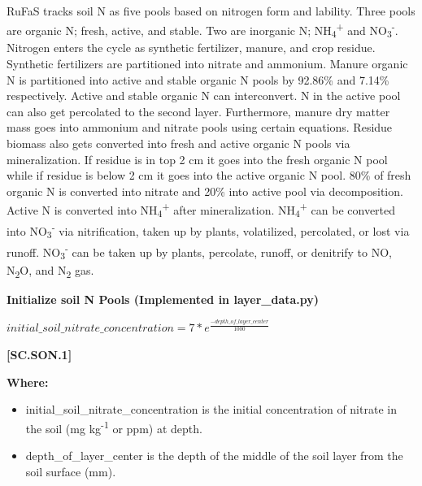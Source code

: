 RuFaS tracks soil N as five pools based on nitrogen form and lability. Three pools are organic N; fresh, active, and stable. Two are inorganic N; NH\textsubscript{4}\textsuperscript{+} and NO\textsubscript{3}\textsuperscript{-}. Nitrogen enters the cycle as synthetic fertilizer, manure, and crop residue. Synthetic fertilizers are partitioned into nitrate and ammonium. Manure organic N is partitioned into active and stable organic N pools by 92.86\% and 7.14\% respectively. Active and stable organic N can interconvert. N in the active pool can also get percolated to the second layer. Furthermore, manure dry matter mass goes into ammonium and nitrate pools using certain equations. Residue biomass also gets converted into fresh and active organic N pools via mineralization. If residue is in top 2 cm it goes into the fresh organic N pool while if residue is below 2 cm it goes into the active organic N pool. 80\% of fresh organic N is converted into nitrate and 20\% into active pool via decomposition. Active N is converted into NH\textsubscript{4}\textsuperscript{+} after mineralization. NH\textsubscript{4}\textsuperscript{+} can be converted into NO\textsubscript{3}\textsuperscript{-} via nitrification, taken up by plants, volatilized, percolated, or lost via runoff. NO\textsubscript{3}\textsuperscript{-} can be taken up by plants, percolate, runoff, or denitrify to NO, N\textsubscript{2}O, and N\textsubscript{2} gas.
\vspace{0.5cm}

\textbf{\large Initialize soil N Pools (Implemented in layer\_data.py)}
            \vspace{0.5cm}
            
    \begin{center}
 \(initial\_soil\_nitrate\_concentration=7 * e^{\frac{-depth\_of\_layer\_center}{1000}}\)
    \end{center}
        \vspace{0.5cm} 
    
            {\raggedleft \textbf{[SC.SON.1]}\par}
            \vspace{0.5cm}

        \textbf{Where:}
            
        \begin{itemize}
            \item initial\_soil\_nitrate\_concentration is the initial concentration of nitrate in the soil (mg kg\textsuperscript{-1} or ppm) at depth.
            \item depth\_of\_layer\_center is the depth of the middle of the soil layer from the soil surface (mm).
        \end{itemize}
    \vspace{0.5cm}

